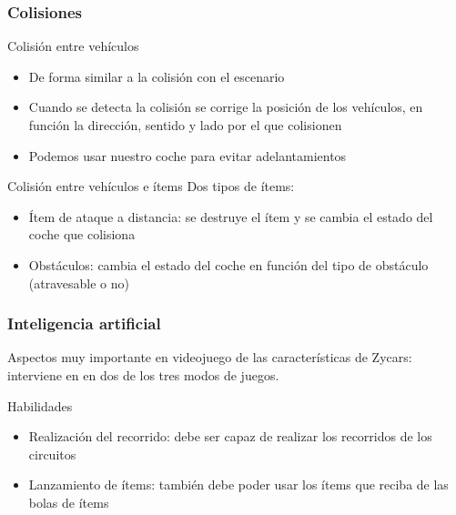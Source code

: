 \begin{frame}
    \frametitle{Colisiones}
    
    \begin{block}{Colisión entre vehículos}
        \begin{itemize}
            \item De forma similar a la colisión con el escenario
            \item Cuando se detecta la colisión se corrige la posición de los vehículos, en función la dirección, 
            sentido y lado por el que colisionen
            \item Podemos usar nuestro coche para evitar adelantamientos
        \end{itemize}
    \end{block}
    
    \begin{block}{Colisión entre vehículos e ítems}
    Dos tipos de ítems:
      \begin{itemize}
            \item Ítem de ataque a distancia: se destruye el ítem y
            se cambia el estado del coche que colisiona
            \item Obstáculos: cambia el estado del coche en función del tipo de obstáculo (atravesable o no)
        \end{itemize}
    \end{block}

\end{frame}

\begin{frame}
    \frametitle{Inteligencia artificial}
    Aspectos muy importante en videojuego de las características
    de Zycars: interviene en en dos de los tres modos de
    juegos.

        \begin{block}{Habilidades}
            \begin{itemize}
                \item Realización del recorrido: debe ser capaz de realizar los 
                recorridos de los circuitos
                \item Lanzamiento de ítems: también debe poder usar los ítems que reciba de las bolas de ítems
            \end{itemize}
        \end{block}
\end{frame}

